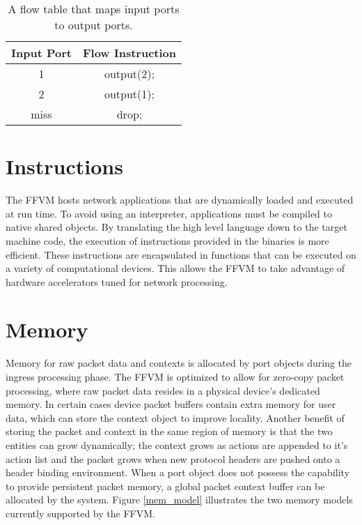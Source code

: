 \begin{table}[h]
  \centering
  \begin{tabular}{||c | c||}
   \hline
   Input Port & Flow Instruction \\ [0.5ex]
   \hline\hline
   1 & output(2); \\
   \hline
   2 & output(1); \\
   \hline
   miss & drop; \\ [1ex]
   \hline
 \end{tabular}
 \caption{A flow table that maps input ports to output ports.}
 \label{flow_table}
\end{table}


\section{Instructions}
\label{vm:insn}
The FFVM hosts network applications that are dynamically loaded and executed
at run time. To avoid using an interpreter, applications must be compiled
to native shared objects. By translating the high level language down to the
target machine code, the execution of instructions provided in the binaries is
more efficient. These instructions are encapsulated in functions that can be
executed on a variety of computational devices. This allows the FFVM to take
advantage of hardware accelerators tuned for network processing.


\section{Memory}
\label{vm:memory}
Memory for raw packet data and contexts is allocated by port objects during the
ingress processing phase. The FFVM is optimized to allow for zero-copy packet
processing, where raw packet data resides in a physical device's dedicated
memory. In certain cases device packet buffers contain extra memory for user
data, which can store the context object to improve locality. Another
benefit of storing the packet and context in the same region of memory is that
the two entities can grow dynamically; the context grows as actions are appended
to it's action list and the packet grows when new protocol headers are pushed
onto a header binding environment. When a port object does not possess the
capability to provide persistent packet memory, a global packet context buffer
can be allocated by the system. Figure \ref{mem_model} illustrates the two
memory models currently supported by the FFVM.

